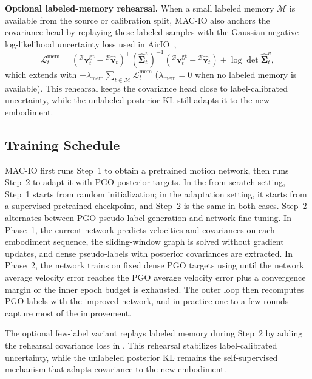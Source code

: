 \textbf{Optional labeled-memory rehearsal.}
When a small labeled memory $\mathcal{M}$ is available from the source or calibration split, MAC-IO also anchors the covariance head by replaying these labeled samples with the Gaussian negative log-likelihood uncertainty loss used in AirIO~\cite{qiu2025airio},
\begin{equation}
\mathcal{L}^{\mathrm{mem}}_t
=
({}^\mathcal{B}\mathbf{v}^{\mathrm{gt}}_t-{}^\mathcal{B}\hat{\mathbf{v}}_t)^{\top}
(\hat{\boldsymbol{\Sigma}}^v_t)^{-1}
({}^\mathcal{B}\mathbf{v}^{\mathrm{gt}}_t-{}^\mathcal{B}\hat{\mathbf{v}}_t)
+
\log\det\hat{\boldsymbol{\Sigma}}^v_t,
\label{eq:macio:memory_covariance_loss}
\end{equation}
which extends  with $+\lambda_{\mathrm{mem}}\sum_{t\in\mathcal{M}}\mathcal{L}^{\mathrm{mem}}_t$ ($\lambda_{\mathrm{mem}}=0$ when no labeled memory is available).
This rehearsal keeps the covariance head close to label-calibrated uncertainty, while the unlabeled posterior KL still adapts it to the new embodiment.

\subsection{Training Schedule}
\label{sec:macio:schedule}

MAC-IO first runs Step~1 to obtain a pretrained motion network, then runs Step~2 to adapt it with PGO posterior targets.
In the from-scratch setting, Step~1 starts from random initialization; in the adaptation setting, it starts from a supervised pretrained checkpoint, and Step~2 is the same in both cases.
Step~2 alternates between PGO pseudo-label generation and network fine-tuning.
In Phase~1, the current network predicts velocities and covariances on each embodiment sequence, the sliding-window graph is solved without gradient updates, and dense pseudo-labels with posterior covariances are extracted.
In Phase~2, the network trains on fixed dense PGO targets using  until the network average velocity error reaches the PGO average velocity error plus a convergence margin or the inner epoch budget is exhausted.
The outer loop then recomputes PGO labels with the improved network, and in practice one to a few rounds capture most of the improvement.

The optional few-label variant replays labeled memory during Step~2 by adding the rehearsal covariance loss in .
This rehearsal stabilizes label-calibrated uncertainty, while the unlabeled posterior KL remains the self-supervised mechanism that adapts covariance to the new embodiment.

